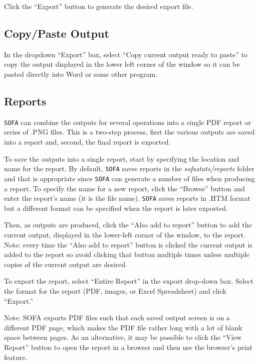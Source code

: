 Click the ``Export'' button to generate the desired export file.


\subsection{Copy/Paste Output}

In the dropdown ``Export'' box, select ``Copy current output ready to paste'' to copy the output displayed in the lower left corner of the window so it can be pasted directly into Word or some other program.

\subsection{Reports}

\texttt{SOFA} can combine the outputs for several operations into a single PDF report or series of .PNG files. This is a two-step process, first the various outputs are saved into a report and, second, the final report is exported.

To save the outputs into a single report, start by specifying the location and name for the report. By default, \texttt{SOFA} saves reports in the \textit{sofastats/reports} folder and that is appropriate since \texttt{SOFA} can generate a number of files when producing a report. To specify the name for a new report, click the ``Browse'' button and enter the report's name (it is the file name). \texttt{SOFA} saves reports in .HTM format but a different format can be specified when the report is later exported.

Then, as outputs are produced, click the ``Also add to report'' button to add the current output, displayed in the lower-left corner of the window, to the report. Note: every time the ``Also add to report'' button is clicked the current output is added to the report so avoid clicking that button multiple times unless multiple copies of the current output are desired.

To export the report, select ``Entire Report'' in the export drop-down box. Select the format for the report (PDF, images, or Excel Spreadsheet) and click ``Export.'' 

Note: SOFA exports PDF files such that each saved output screen is on a different PDF page, which makes the PDF file rather long with a lot of blank space between pages. As an alternative, it may be possible to click the ``View Report'' button to open the report in a browser and then use the browser's print feature.



